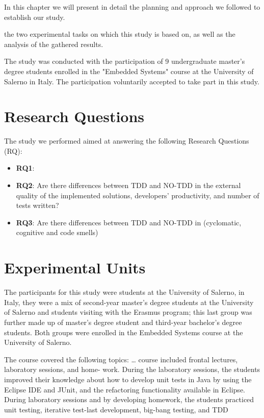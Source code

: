 In this chapter we will present in detail the planning and approach we followed to establish our study.

the two experimental tasks on which this study is based on, as well as the analysis of the gathered results.

The study was conducted with the participation of 9 undergraduate master's degree students enrolled in the "Embedded Systems" course at the University of Salerno in Italy. The participation voluntarily accepted to take part in this study.


\section{Research Questions}
The study we performed aimed at answering the following Research Questions (RQ):
\begin{itemize}
    \item \textbf{RQ1}:
    \item \textbf{RQ2}: Are there differences between TDD and NO-TDD in the external quality of the implemented solutions, developers' productivity, and number of tests written?
    \item \textbf{RQ3}: Are there differences between TDD and NO-TDD in (cyclomatic, cognitive and code smells)
\end{itemize}




\section{Experimental Units}
The participants for this study were students at the University of Salerno, in Italy, they were a mix of second-year master's degree students at the University of Salerno and students visiting with the Erasmus program; this last group was further made up of master's degree student and third-year bachelor's degree students. Both groups were enrolled in the Embedded Systems course at the University of Salerno.

The course covered the following topics: \dots
course included frontal lectures, laboratory sessions, and home-
work. During the laboratory sessions, the students improved their
knowledge about how to develop unit tests in Java by using the
Eclipse IDE and JUnit, and the refactoring functionality available in
Eclipse. During laboratory sessions and by developing homework,
the students practiced unit testing, iterative test-last development,
big-bang testing, and TDD

